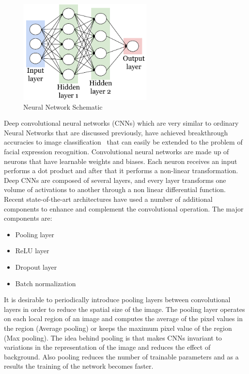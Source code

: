 \begin{figure}[t]
    \begin{center}
    \includegraphics[width=0.6\textwidth]{images/neural_network.pdf}
    \end{center}
    \caption{Neural Network Schematic} \label{fig:neural_network}
\end{figure}

Deep convolutional neural networks (CNNs) which are very similar to ordinary Neural Networks that are discussed previously, have achieved breakthrough accuracies to image classification~\cite{lecun1990handwritten} that can easily be extended to the problem of facial expression recognition. Convolutional neural networks are made up of neurons that have learnable weights and biases. Each neuron receives an input performs a dot product and after that it performs a non-linear transformation. Deep CNNs are composed of several layers, and every layer transforms one volume of activations to another through a non linear differential function. Recent state-of-the-art architectures have used a number of additional components to enhance and complement the convolutional operation. The major components are:

\begin{itemize}
  \item Pooling layer
  \item ReLU layer~\cite{nair2010rectified}
  \item Dropout layer~\cite{srivastava2014dropout}
  \item Batch normalization~\cite{ioffe2015batch}
\end{itemize}

It is desirable to periodically introduce pooling layers between convolutional layers in order to reduce the spatial size of the image. The pooling layer operates on each local region of an image and computes the average of the pixel values in the region (Average pooling) or keeps the maximum pixel value of the region (Max pooling). The idea behind pooling is that makes CNNs invariant to variations in the representation of the image and reduces the effect of background. Also pooling reduces the number of trainable parameters and as a results the training of the network becomes faster. 

